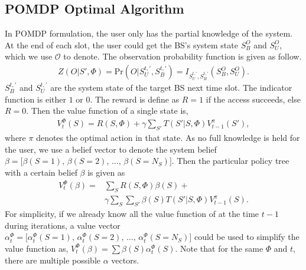 \documentclass[conference]{IEEEtran}
\begin{document}
\subsection{POMDP Optimal Algorithm}
In POMDP formulation, the user only has the partial knowledge of the system.
At the end of each slot, the user could get the BS's system state \(S_B^O\) and \(S_U^O\),
which we use \(\mathcal{O}\) to denote.
The observation probability function is given as follow.
\begin{align}
	Z\left(O|S',\Phi\right) = \mbox{Pr}\left(O|S_U^{t,'}, S_B^{t,'}\right) =
	I_{S_U^{t,'},S_B^{t,'}}\left(S_B^O, S_U^O\right).
\end{align}
\(S_B^{t,'}\) and \(S_U^{t,'}\) are the system state of the target BS next time slot.
The indicator function is either \(1\) or \(0\).
The reward is define as \(R = 1\) if the access succeeds, else \(R= 0\).
Then the value function of a single state is,
\begin{equation}
\begin{aligned}
	V_t^\Phi\left(S\right) = R\left(S,\Phi\right) +\gamma\sum\limits_{S'}T\left(S'|S,\Phi\right)V_{t-1}^\pi\left(S'\right),
\end{aligned}%
\end{equation}
where \(\pi\) denotes the optimal action in that state.
As no full knowledge is held for the user, we use a belief vector to denote the system belief
\(\beta = \lbrack \beta\left(S = 1\right),\,\beta\left(S = 2\right),\,\ldots,\,\beta\left(S = N_S\right)\rbrack\).	
Then the particular policy tree with a certain belief \(\beta\) is given as
\begin{equation}
\begin{aligned}
	V_t^\Phi\left(\beta\right) = & \sum\limits_{S}R\left(S,\Phi\right)\beta\left(S\right) +\\
	&	\gamma\sum\limits_{S}\sum\limits_{S'}\beta\left(S\right)T\left(S'|S,\Phi\right)V_{t-1}^\pi\left(S\right).
\end{aligned}
\end{equation}
For simplicity, if we already know all the value function of at the time \(t-1\) during iterations,
a value vector \(\alpha_t^\Phi = \lbrack \alpha_t^\Phi\left(S = 1\right),\,
\alpha_t^\Phi\left(S = 2\right),\,\ldots,\,\alpha_t^\Phi\left(S = N_S\right)\rbrack\)
could be used to simplify the value function as,
\(V_t^\Phi\left(\beta\right) = \sum\beta\left(S\right)\alpha_t^\Phi\left(S\right)\).
Note that for the same \(\Phi\) and \(t\), there are multiple possible \(\alpha\) vectors.
\end{document}

